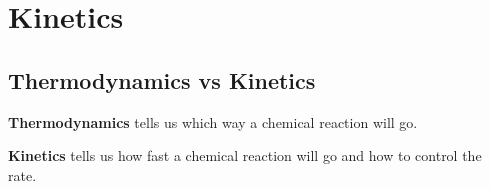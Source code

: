 \documentclass[a4paper,12pt]{article}
\begin{document}
\newpage
\section{Kinetics}
\subsection{Thermodynamics vs Kinetics}
\textbf{Thermodynamics} tells us which way a chemical reaction will go.\par
\textbf{Kinetics} tells us how fast a chemical reaction will go and how to control the rate.\par





























\newpage
\end{document}

